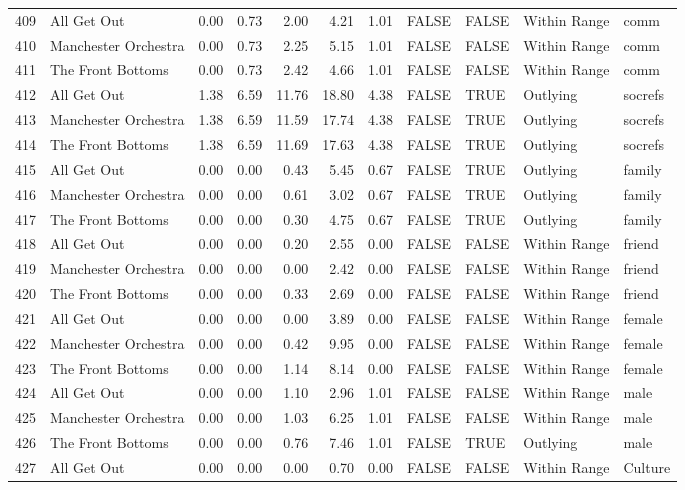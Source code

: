 \begin{table}[ht]
\begin{tabular}{rlrrrrrllll}
  409 & All Get Out & 0.00 & 0.73 & 2.00 & 4.21 & 1.01 & FALSE & FALSE & Within Range & comm \\ 
  410 & Manchester Orchestra & 0.00 & 0.73 & 2.25 & 5.15 & 1.01 & FALSE & FALSE & Within Range & comm \\ 
  411 & The Front Bottoms & 0.00 & 0.73 & 2.42 & 4.66 & 1.01 & FALSE & FALSE & Within Range & comm \\ 
  412 & All Get Out & 1.38 & 6.59 & 11.76 & 18.80 & 4.38 & FALSE & TRUE & Outlying & socrefs \\ 
  413 & Manchester Orchestra & 1.38 & 6.59 & 11.59 & 17.74 & 4.38 & FALSE & TRUE & Outlying & socrefs \\ 
  414 & The Front Bottoms & 1.38 & 6.59 & 11.69 & 17.63 & 4.38 & FALSE & TRUE & Outlying & socrefs \\ 
  415 & All Get Out & 0.00 & 0.00 & 0.43 & 5.45 & 0.67 & FALSE & TRUE & Outlying & family \\ 
  416 & Manchester Orchestra & 0.00 & 0.00 & 0.61 & 3.02 & 0.67 & FALSE & TRUE & Outlying & family \\ 
  417 & The Front Bottoms & 0.00 & 0.00 & 0.30 & 4.75 & 0.67 & FALSE & TRUE & Outlying & family \\ 
  418 & All Get Out & 0.00 & 0.00 & 0.20 & 2.55 & 0.00 & FALSE & FALSE & Within Range & friend \\ 
  419 & Manchester Orchestra & 0.00 & 0.00 & 0.00 & 2.42 & 0.00 & FALSE & FALSE & Within Range & friend \\ 
  420 & The Front Bottoms & 0.00 & 0.00 & 0.33 & 2.69 & 0.00 & FALSE & FALSE & Within Range & friend \\ 
  421 & All Get Out & 0.00 & 0.00 & 0.00 & 3.89 & 0.00 & FALSE & FALSE & Within Range & female \\ 
  422 & Manchester Orchestra & 0.00 & 0.00 & 0.42 & 9.95 & 0.00 & FALSE & FALSE & Within Range & female \\ 
  423 & The Front Bottoms & 0.00 & 0.00 & 1.14 & 8.14 & 0.00 & FALSE & FALSE & Within Range & female \\ 
  424 & All Get Out & 0.00 & 0.00 & 1.10 & 2.96 & 1.01 & FALSE & FALSE & Within Range & male \\ 
  425 & Manchester Orchestra & 0.00 & 0.00 & 1.03 & 6.25 & 1.01 & FALSE & FALSE & Within Range & male \\ 
  426 & The Front Bottoms & 0.00 & 0.00 & 0.76 & 7.46 & 1.01 & FALSE & TRUE & Outlying & male \\ 
  427 & All Get Out & 0.00 & 0.00 & 0.00 & 0.70 & 0.00 & FALSE & FALSE & Within Range & Culture \\ 

\end{tabular}
\end{table}
